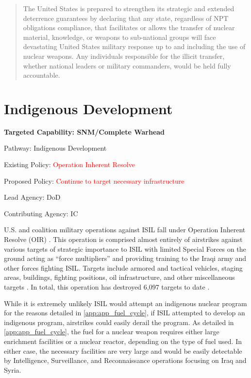 \documentclass{report}
\begin{document}
\blockquote{The United States is prepared to strengthen its strategic and extended deterrence guarantees by declaring that any state, regardless of NPT obligations compliance, that facilitates or allows the transfer of nuclear material, knowledge, or weapons to sub-national groups will face devastating United States military response up to and including the use of nuclear weapons.  Any individuals responsible for the illicit transfer, whether national leaders or military commanders, would be held fully accountable.}








\section{Indigenous Development}




\bfseries Targeted Capability: SNM/Complete Warhead 

Pathway: Indigenous Development

Existing Policy: \textcolor{red}{Operation Inherent Resolve}

Proposed Policy: \textcolor{red}{Continue to target necessary infrastructure}

Lead Agency: DoD

Contributing Agency: IC \normalfont


U.S. and coalition military operations against ISIL fall under Operation Inherent Resolve (OIR) \cite{GlobalSecurity2015}. This operation is comprised almost entirely of airstrikes against various targets of strategic importance to ISIL with limited Special Forces on the ground acting as \enquote{force multipliers} and providing training to the Iraqi army and other forces fighting ISIL. Targets include armored and tactical vehicles, staging areas, buildings, fighting positions, oil infrastructure, and other miscellaneous targets \cite{U.S.DepartmentofDefense2014}. In total, this operation has destroyed 6,097 targets to date \cite{U.S.DepartmentofDefense2014}.

While it is extremely unlikely ISIL would attempt an indigenous nuclear program for the reasons detailed in \autoref{app:app_fuel_cycle}, if ISIL attempted to develop an indigenous program, airstrikes could easily derail the program. As detailed in \autoref{app:app_fuel_cycle}, the fuel for a nuclear weapon requires either large enrichment facilities or a nuclear reactor, depending on the type of fuel used. In either case, the necessary facilities are very large and would be easily detectable by Intelligence, Surveillance, and Reconnaissance operations focusing on Iraq and Syria. 
\end{document}

